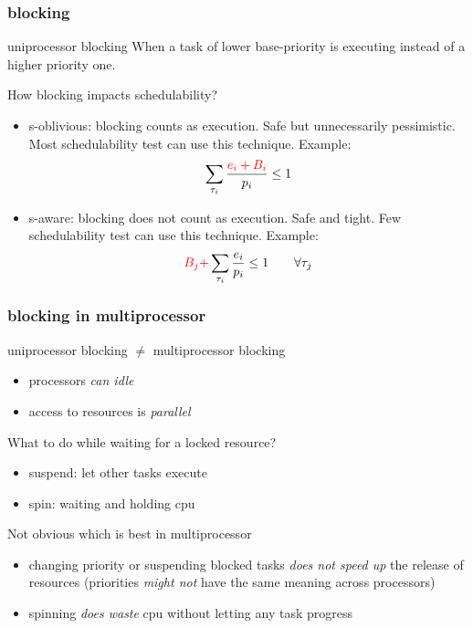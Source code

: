 \documentclass{beamer}
\begin{document}
\begin{frame}
\frametitle{blocking}
\begin{block}{uniprocessor blocking}
When a task of lower base-priority is executing instead of a higher priority one.
\end{block}
How blocking impacts schedulability?
\begin{itemize}
  \item s-oblivious: blocking counts as execution. Safe but unnecessarily pessimistic. Most schedulability test can use this technique. Example:
  \[\sum_{\tau_i} \frac{\textcolor{red}{e_i + B_i}}{p_i} \leq 1\]
  \item s-aware: blocking does not count as execution. Safe and tight. Few schedulability test can use this technique.  Example:
  \[\textcolor{red}{B_j +} \sum_{\tau_i} \frac{e_i}{p_i} \leq 1 \qquad \forall\tau_j\]
\end{itemize}
\end{frame}

\begin{frame}
\frametitle{blocking in multiprocessor}

uniprocessor blocking $\neq$ multiprocessor blocking
\begin{itemize}
\item processors \emph{can idle}
\item access to resources is \emph{parallel}
\end{itemize}
What to do while waiting for a locked resource?
  \begin{itemize}
  \item suspend: let other tasks execute
  \item spin: waiting and holding cpu
  \end{itemize}
Not obvious which is best in multiprocessor
\begin{itemize}
  \item changing priority or suspending blocked tasks \emph{does not speed up} the release of resources (priorities \emph{might not} have the same meaning across processors)
  \item spinning \emph{does waste} cpu without letting any task progress
\end{itemize}
\end{frame}
\end{document}
